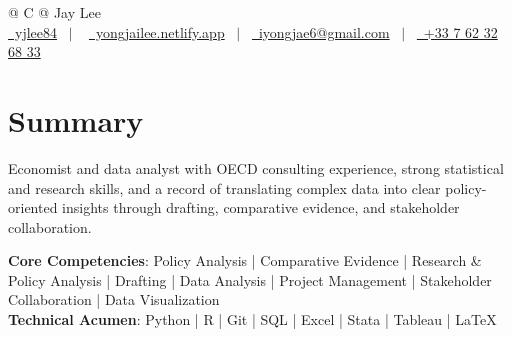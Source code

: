 \documentclass[a4paper,12pt]{article}
\begin{document}
\pagestyle{empty} 



\begin{tabularx}{\linewidth}{@{} C @{}}
\Huge{Jay Lee} \\[7.5pt]
\href{https://github.com/yjlee84}{\raisebox{-0.05\height}\faGithub\ yjlee84} \ $|$ \ 
\href{https://yongjailee.netlify.app}{\raisebox{-0.05\height}\faGlobe \ yongjailee.netlify.app} \ $|$ \ 
\href{mailto:email@mysite.com}{\raisebox{-0.05\height}\faEnvelope \ iyongjae6@gmail.com} \ $|$ \ 
\href{tel:+000000000000}{\raisebox{-0.05\height}\faMobile \ +33 7 62 32 68 33} \\
\end{tabularx}


\section{Summary}
Economist and data analyst with OECD consulting experience, strong statistical and research skills, and a record of translating complex data into clear policy-oriented insights through drafting, comparative evidence, and stakeholder collaboration.

\textbf{Core Competencies}: Policy Analysis | Comparative Evidence | Research \& Policy Analysis | Drafting | Data Analysis | Project Management | Stakeholder Collaboration | Data Visualization\\
\textbf{Technical Acumen}: Python | R | Git | SQL | Excel | Stata | Tableau | \LaTeX{}
\end{document}
